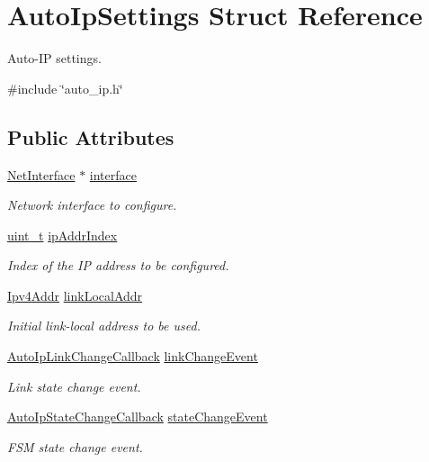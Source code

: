\hypertarget{structAutoIpSettings}{}\section{Auto\+Ip\+Settings Struct Reference}
\label{structAutoIpSettings}


Auto-\/\+IP settings.  




{\ttfamily \#include \char`\"{}auto\+\_\+ip.\+h\char`\"{}}

\subsection*{Public Attributes}
\begin{DoxyCompactItemize}
\item 
\hyperlink{net_8h_a2234db8911a1148c9159979d8f5e0d6b}{Net\+Interface} $\ast$ \hyperlink{structAutoIpSettings_aefe9b77105f2ee05b5c09d022799c610}{interface}
\begin{DoxyCompactList}\small\item\em Network interface to configure. \end{DoxyCompactList}\item 
\hyperlink{compiler__port_8h_a12a1e9b3ce141648783a82445d02b58d}{uint\+\_\+t} \hyperlink{structAutoIpSettings_ad6a4b80c0e91682a7a8e333720f99e54}{ip\+Addr\+Index}
\begin{DoxyCompactList}\small\item\em Index of the IP address to be configured. \end{DoxyCompactList}\item 
\hyperlink{ipv4_8h_a411debb3d770caa0c06d3f73367da37f}{Ipv4\+Addr} \hyperlink{structAutoIpSettings_a3352d92469da4349341f2525dc259d01}{link\+Local\+Addr}
\begin{DoxyCompactList}\small\item\em Initial link-\/local address to be used. \end{DoxyCompactList}\item 
\hyperlink{auto__ip_8h_a88d83d5933a137c867d45270dc4f89e7}{Auto\+Ip\+Link\+Change\+Callback} \hyperlink{structAutoIpSettings_a5f12d52e8a17c816e573c730dc28cb28}{link\+Change\+Event}
\begin{DoxyCompactList}\small\item\em Link state change event. \end{DoxyCompactList}\item 
\hyperlink{auto__ip_8h_a2b8a7f5af501a3e7b34fdd9b496f00a2}{Auto\+Ip\+State\+Change\+Callback} \hyperlink{structAutoIpSettings_afa5654a05fd29d59e59d2a346b0c0257}{state\+Change\+Event}
\begin{DoxyCompactList}\small\item\em F\+SM state change event. \end{DoxyCompactList}\end{DoxyCompactItemize}


